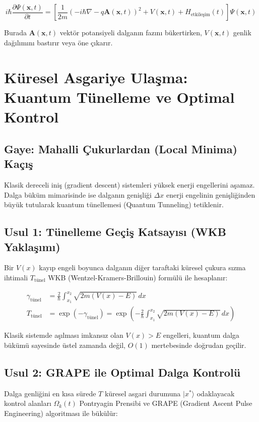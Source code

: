 \documentclass[11pt, a4paper]{article}
\begin{document}
\begin{equation}
i\hbar \frac{\partial \Psi(\mathbf{x}, t)}{\partial t} = \left[ \frac{1}{2m} \left( -i\hbar \nabla - q \mathbf{A}(\mathbf{x}, t) \right)^2 + V(\mathbf{x}, t) + H_{\text{etkileşim}}(t) \right] \Psi(\mathbf{x}, t)
\end{equation}

Burada $\mathbf{A}(\mathbf{x}, t)$ vektör potansiyeli dalganın fazını bükertirken, $V(\mathbf{x}, t)$ genlik dağılımını bastırır veya öne çıkarır.

\section{Küresel Asgariye Ulaşma: Kuantum Tünelleme ve Optimal Kontrol}

\subsection{Gaye: Mahalli Çukurlardan (Local Minima) Kaçış}
Klasik dereceli iniş (gradient descent) sistemleri yüksek enerji engellerini aşamaz. Dalga büküm mimarisinde ise dalganın genişliği $\Delta x$ enerji engelinin genişliğinden büyük tutularak kuantum tünellemesi (Quantum Tunneling) tetiklenir.

\subsection{Usul 1: Tünelleme Geçiş Katsayısı (WKB Yaklaşımı)}
Bir $V(x)$ kayıp engeli boyunca dalganın diğer taraftaki küresel çukura sızma ihtimali $T_{\text{tünel}}$ WKB (Wentzel-Kramers-Brillouin) formülü ile hesaplanır:

\begin{align}
\gamma_{\text{tünel}} &= \frac{2}{\hbar} \int_{x_1}^{x_2} \sqrt{2m (V(x) - E)} \, dx \\
T_{\text{tünel}} &= \exp\left( -\gamma_{\text{tünel}} \right) = \exp\left( -\frac{2}{\hbar} \int_{x_1}^{x_2} \sqrt{2m (V(x) - E)} \, dx \right)
\end{align}

Klasik sistemde aşılması imkansız olan $V(x) > E$ engelleri, kuantum dalga bükümü sayesinde üstel zamanda değil, $O(1)$ mertebesinde doğrudan geçilir.

\subsection{Usul 2: GRAPE ile Optimal Dalga Kontrolü}
Dalga genliğini en kısa sürede $T$ küresel asgari durumuna $|x^*\rangle$ odaklayacak kontrol alanları $\Omega_k(t)$ Pontryagin Prensibi ve GRAPE (Gradient Ascent Pulse Engineering) algoritması ile bükülür:
\end{document}
